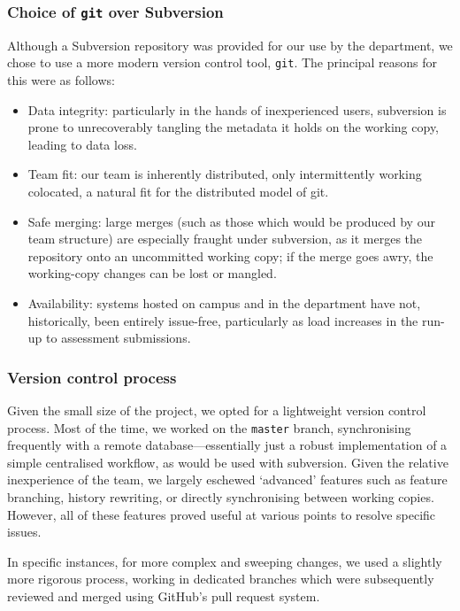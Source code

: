 \subsubsection{Choice of \texttt{git} over Subversion}

Although a Subversion repository was provided for our use by the
department, we chose to use a more modern version control tool,
\texttt{git}. The principal reasons for this were as follows:

\begin{itemize}
\item Data integrity: particularly in the hands of inexperienced
  users, subversion is prone to unrecoverably tangling the metadata it
  holds on the working copy, leading to data loss.
\item Team fit: our team is inherently distributed, only
  intermittently working colocated, a natural fit for the distributed
  model of git.
\item Safe merging: large merges (such as those which would be
  produced by our team structure) are especially fraught under
  subversion, as it merges the repository onto an uncommitted working
  copy; if the merge goes awry, the working-copy changes can be lost
  or mangled.
\item Availability: systems hosted on campus and in the department
  have not, historically, been entirely issue-free, particularly as
  load increases in the run-up to assessment submissions.
\end{itemize}

\subsubsection{Version control process}

Given the small size of the project, we opted for a lightweight
version control process. Most of the time, we worked on the
\texttt{master} branch, synchronising frequently with a remote
database---essentially just a robust implementation of a simple
centralised workflow, as would be used with subversion. Given the
relative inexperience of the team, we largely eschewed `advanced'
features such as feature branching, history rewriting, or directly
synchronising between working copies. However, all of these features
proved useful at various points to resolve specific issues.

In specific instances, for more complex and sweeping changes, we used
a slightly more rigorous process, working in dedicated branches which
were subsequently reviewed and merged using GitHub's pull request
system.

